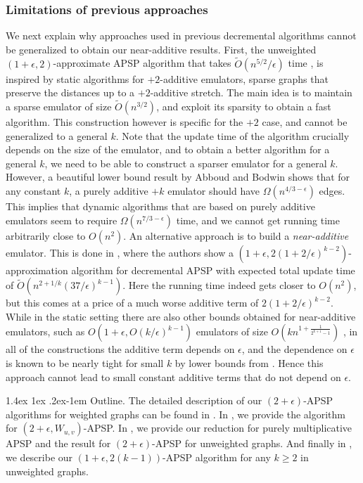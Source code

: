 \documentclass[11pt]{article}
\makeatletter
\theoremstyle{definition}
\theoremstyle{remark}
\renewcommand{\paragraph}{%
  \@startsection{paragraph}{4}%
  {\z@}{1.4ex \@plus 1ex \@minus .2ex}{-1em}%
  {\normalfont\normalsize\bfseries}%
}
\makeatother
\begin{document}
\subsubsection{Limitations of previous approaches} 
We next explain why approaches used in previous decremental algorithms cannot be generalized to obtain our near-additive results. First, the unweighted $(1+\epsilon,2)$-approximate APSP algorithm that takes $\tilde{O}(n^{5/2}/\epsilon)$ time \cite{HKN2016}, is inspired by static algorithms for $+2$-additive emulators, sparse graphs that preserve the distances up to a $+2$-additive stretch. The main idea is to maintain a sparse emulator of size $\tilde{O}(n^{3/2})$, and exploit its sparsity to obtain a fast algorithm. This construction however is specific for the $+2$ case, and cannot be generalized to a general $k$. Note that the update time of the algorithm crucially depends on the size of the emulator, and to obtain a better algorithm for a general $k$, we need to be able to construct a sparser emulator for a general $k$.
However, a beautiful lower bound result by Abboud and Bodwin \cite{abboud20174} shows that for any constant $k$, a purely additive $+k$ emulator should have $\Omega(n^{4/3-\epsilon})$ edges. 
This implies that dynamic algorithms that are based on purely additive emulators seem to require $\Omega(n^{7/3-\epsilon})$ time, and we cannot get running time arbitrarily close to $O(n^2)$. An alternative approach is to build a \emph{near-additive} emulator. This is done in \cite{HKN14}, where the authors show a $(1+\epsilon, 2(1+2/\epsilon)^{k-2})$-approximation algorithm for decremental APSP with expected total update time of $\tilde{O}(n^{2+1/k} (37/\epsilon)^{k-1})$. Here the running time indeed gets closer to $O(n^2)$, but this comes at a price of a much worse additive term of $2(1+2/\epsilon)^{k-2}$. While in the static setting there are also other bounds obtained for near-additive emulators, such as $O(1+\epsilon,O(k/\epsilon)^{k-1})$ emulators of size $O(kn^{1+\frac{1}{2^{k+1}-1}})$ \cite{elkin2004,thorup2006spanners,abboud2018hierarchy,elkin2020near}, in all of the constructions the additive term depends on $\epsilon$, and the dependence on $\epsilon$ is known to be nearly tight for small $k$ by lower bounds from \cite{abboud2018hierarchy}. Hence this approach cannot lead to small constant additive terms that do not depend on $\epsilon$.


\paragraph{Outline.}
The detailed description of our $(2+\epsilon)$-APSP algorithms for weighted graphs can be found in . In , we provide the algorithm for $(2+\epsilon,W_{u,v})$-APSP. In , we provide our reduction for purely multiplicative APSP and the result for $(2+\epsilon)$-APSP for unweighted graphs. And finally in , we describe our $(1+\epsilon, 2(k-1))$-APSP algorithm for any $k \geq 2$ in unweighted graphs. 
\end{document}
